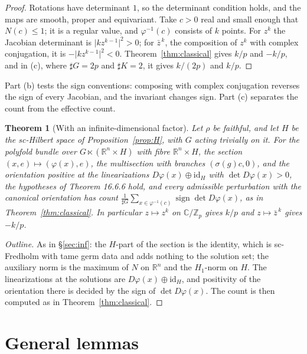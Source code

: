 \documentclass[11pt,a4paper]{article}
\theoremstyle{plain}
\newtheorem{theorem}{Theorem}[section]
\theoremstyle{definition}
\theoremstyle{remark}
\newcommand{\C}{\mathbb{C}}
\newcommand{\R}{\mathbb{R}}
\newcommand{\Z}{\mathbb{Z}}
\newcommand{\abs}[1]{\lvert #1\rvert}
\newcommand{\card}{\sharp}
\newcommand{\id}{\mathrm{id}}
\begin{document}
\begin{proof}
Rotations have determinant $1$, so the determinant condition holds, and the maps are smooth, proper and
equivariant. Take $c>0$ real and small enough that $N(c)\le1$; it is a regular value, and $\varphi^{-1}(c)$
consists of $k$ points. For $z^k$ the Jacobian determinant is $\abs{kz^{k-1}}^2>0$; for $\bar z^{\,k}$, the
composition of $z^k$ with complex conjugation, it is $-\abs{kz^{k-1}}^2<0$. Theorem~\ref{thm:classical}
gives $k/p$ and $-k/p$, and in (c), where $\card G=2p$ and $\card K=2$, it gives $k/(2p)$ and $k/p$.
\end{proof}

Part (b) tests the sign conventions: composing with complex conjugation reverses the sign of every
Jacobian, and the invariant changes sign. Part (c) separates the count from the effective count.

\begin{theorem}[With an infinite-dimensional factor]\label{thm:classicalinf}
Let $\rho$ be faithful, and let $H$ be the sc-Hilbert space of Proposition~\ref{prop:H}, with $G$ acting
trivially on it. For the polyfold bundle over $G\ltimes(\R^n\times H)$ with fibre $\R^n\times H$, the
section $(x,e)\mapsto(\varphi(x),e)$, the multisection with branches $(\sigma(g)c,0)$, and the orientation
positive at the linearizations $D\varphi(x)\oplus\id_H$ with $\det D\varphi(x)>0$, the hypotheses of
Theorem 16.6.6 hold, and every admissible perturbation with the canonical orientation has count
$\frac1{\card G}\sum_{x\in\varphi^{-1}(c)}\operatorname{sign}\det D\varphi(x)$, as in
Theorem~\ref{thm:classical}. In particular $z\mapsto z^k$ on $\C/\Z_p$ gives $k/p$ and
$z\mapsto\bar z^{\,k}$ gives $-k/p$.
\end{theorem}

\begin{proof}[Outline]
As in \S\ref{sec:inf}: the $H$-part of the section is the identity, which is sc-Fredholm with tame germ
data and adds nothing to the solution set; the auxiliary norm is the maximum of $N$ on $\R^n$ and the $H_1$-norm on $H$. The
linearizations at the solutions are $D\varphi(x)\oplus\id_H$, and positivity of the orientation there is
decided by the sign of $\det D\varphi(x)$. The count is then computed as in Theorem~\ref{thm:classical}.
\end{proof}

\section{General lemmas}\label{sec:lemmas}
\end{document}
